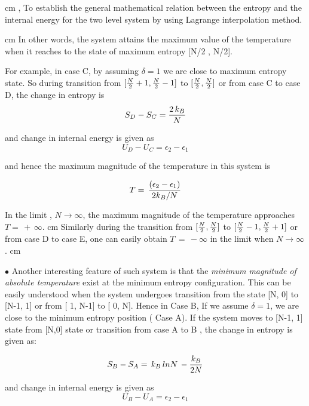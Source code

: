 \documentclass{article}
\begin{document}
 cm
, To establish the  general mathematical relation between the  entropy and the internal energy for the  two level system by using Lagrange interpolation method.

 cm
 In other words, the system attains the maximum value of the temperature when it reaches to the state of  maximum  entropy [N/2 , N/2].

For example, in case C, by assuming $ \delta = 1$ we are close to  maximum entropy state.  So during transition from 
$[{N \over 2 } + 1, {N \over 2} -1]$ to $[ { N\over 2}  , {N\over2} ]$  or from case C to case D, the change in entropy is 
$$S_D - S_C = { 2\,k_B \over N}$$

and change in internal energy is given as 
$$U_D - U_C = \epsilon_2 - \epsilon_1$$

and hence the maximum  magnitude of the temperature in this  system is 

$$ T = \, {(\epsilon_2 - \epsilon_1)  \over {2k_B}/N}$$

\noindent In the limit , $ N \rightarrow \infty$, the maximum magnitude of the  temperature approaches $T  =\,+ \,\infty$.
 cm
\noindent Similarly during the transition from  $[ { N\over 2} , {N\over2} ]$ to $[{N \over 2 } -1, {N \over 2} + 1]$ or from case D to case E, one can easily obtain  $ T \, = \, - \infty$ in the limit when $  N \rightarrow \infty$.
 cm

\noindent $\bullet$ Another interesting feature of such system is that the {\it  minimum  magnitude of absolute temperature} exist at the minimum entropy configuration. This can be easily understood when the system undergoes transition from the state [N, 0] to [N-1, 1] or from [ 1, N-1] to [ 0, N]. Hence
in Case B, If we assume $\delta =1 $, we are close to the minimum entropy position ( Case A). If the system moves to [N-1, 1] state from [N,0] state or  transition from case  A to B , the change in entropy is given as:

 
$$S_B - S_A =\, k_B\, ln{N}\,-{ k_B \over 2N}$$

and change in internal energy is given as 
$$U_B - U_A = \epsilon_2 - \epsilon_1$$
\end{document}
